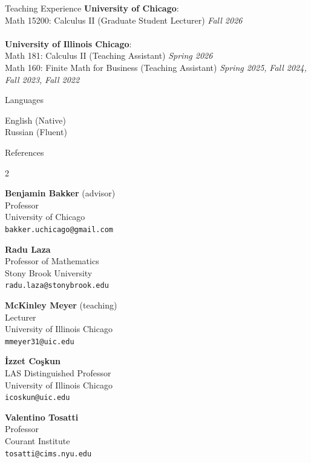 \documentclass{resume} %
\begin{document}
\begin{rSection}{Teaching Experience}
\textbf{University of Chicago}: \\
Math 15200: Calculus II (Graduate Student Lecturer) \hfill \textit{Fall 2026}\\
\\
\textbf{University of Illinois Chicago}: \\
Math 181: Calculus II (Teaching Assistant) \hfill \textit{Spring 2026} \\
Math 160: Finite Math for Business (Teaching Assistant) \hfill \textit{Spring 2025,} 
\newline \mbox{} \hfill \textit{Fall 2024,} 
\newline \mbox{} \hfill \textit{Fall 2023,} 
\newline \mbox{} \hfill \textit{Fall 2022}
\end{rSection}


\begin{rSection}{Languages}

English (Native) \\
Russian (Fluent)

\end{rSection}


\begin{rSection}{References}
\begin{multicols}{2}

{\bf Benjamin Bakker} (advisor)\\
Professor
\\University of Chicago
\\\texttt{bakker.uchicago@gmail.com}


{\bf Radu Laza}
\\Professor of Mathematics
\\Stony Brook University
\\ {\tt radu.laza@stonybrook.edu}


{\bf McKinley Meyer} (teaching)\\
Lecturer \\
University of Illinois Chicago\\
\texttt{mmeyer31@uic.edu}


\columnbreak

{\bf \.{I}zzet Co\c{s}kun}\\
LAS Distinguished Professor\\
University of Illinois Chicago\\
\texttt{icoskun@uic.edu}


{\bf Valentino Tosatti}\\
Professor\\
Courant Institute \\
\texttt{tosatti@cims.nyu.edu}





\end{multicols}
\end{rSection}
\end{document}

